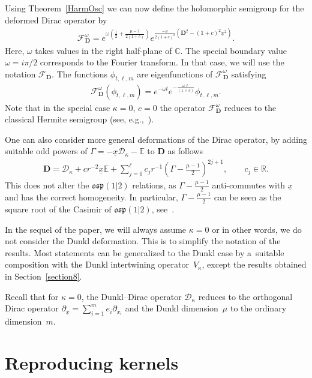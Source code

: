 \documentclass[11pt]{article}
\numberwithin{equation}{section}
\numberwithin{theorem}{section}
\numberwithin{proposition}{section}
\numberwithin{lemma}{section}
\numberwithin{corollary}{section}
\numberwithin{definition}{section}
\numberwithin{example}{section}
\numberwithin{remark}{section}
\numberwithin{note}{section}
\theoremstyle{remark}
\newcommand{\mR}{\mathbb{R}}
\newcommand{\mC}{\mathbb{C}}
\newcommand{\mE}{\mathbb{E}}
\newcommand{\cD}{\mathcal{D}}
\newcommand{\cF}{\mathcal{F}}
\newcommand{\dD}{\textbf{D}}
\newcommand{\ux}{\underline{x}}
\newcommand{\upx}{\partial_{\underline{x}}}
\def\k{{\kappa}}
\def\o{{\omega}}
\begin{document}
Using Theorem~\ref{HarmOsc} we can now def\/ine the holomorphic semigroup for the deformed Dirac
operator by
\begin{gather*}
\cF_{\dD}^{\omega}=e^{\o\left(\frac{1}{2}+\frac{\mu-1}{2(1+c)}\right)}e^{\frac{-\o}{
2(1+c)^{2}}\left(\dD^{2}-(1+c)^{2}\ux^{2}\right)}.
\end{gather*}
Here, $\omega$ takes values in the right half-plane of $\mC$.
The special boundary value $\o=i\pi/2$ corresponds to the Fourier transform.
In that case, we will use the notation $\cF_{\dD}$.
The functions $\phi_{t,\ell,m}$ are eigenfunctions of $\cF_{\dD}^{\omega}$ satisfying
\begin{gather}
\label{eigvalsFourier}
\cF_{\dD}^{\o}(\phi_{t,\ell,m})=e^{-\o t}e^{-\frac{\o\ell}{(1+c)}}\phi_{t,\ell,m}.
\end{gather}
Note that in the special case $\kappa=0$, $c=0$ the operator $\cF_{\dD}^{\omega}$ reduces to the
classical Hermite semigroup (see, e.g.,~\cite{MR0974332}).

\begin{remark}
One can also consider more general deformations of the Dirac operator, by adding suitable odd
powers of $\Gamma=-\ux\cD_{\k}-\mE$ to $\dD$ as follows
\begin{gather*}
\dD=\cD_{\k}+c r^{-2}\ux\mE+\sum_{j=0}^{\ell}c_{j}r^{-1}\left(\Gamma-\frac{\mu-1}{2}
\right)^{2j+1},\qquad c_{j}\in\mR.
\end{gather*}
This does not alter the $\mathfrak{osp}(1|2)$ relations, as $\Gamma-\frac{\mu-1}{2}$
anti-commutes with $\ux$ and has the correct homogeneity.
In particular, $\Gamma-\frac{\mu-1}{2}$ can be seen as the square root of the Casimir of
$\mathfrak{osp}(1|2)$, see~\cite[Example~2 in Section~2.5]{MR1773773}.
\end{remark}

In the sequel of the paper, we will always assume $\kappa=0$ or in other words, we do not consider
the Dunkl deformation.
This is to simplify the notation of the results.
Most statements can be generalized to the Dunkl case by a~suitable composition with the Dunkl
intertwining operator~$V_{\k}$, except the results obtained in Section~\ref{section8}.

Recall that for $\kappa=0$, the Dunkl--Dirac operator $\cD_{\k}$ reduces to the orthogonal Dirac
operator $\upx=\sum\limits_{i=1}^{m}e_{i}\partial_{x_{i}}$ and the Dunkl dimension~$\mu$ to the ordinary
dimension~$m$.

\section{Reproducing kernels}\label{section5}
\end{document}
